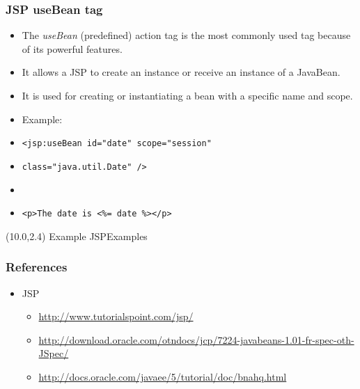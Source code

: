 \documentclass[10pt,xcolor=pdflatex]{beamer}
\begin{document}
\begin{frame}[containsverbatim]\frametitle{JSP useBean tag}
	\begin{itemize}
    	\item The \emph{useBean} (predefined) action tag is the most commonly used tag because of its powerful features.
		\item It allows a JSP to create an instance or receive an instance of a JavaBean.
		\item It is used for creating or instantiating a bean with a specific name and scope.
		\item Example:
		\item[] \verb;<jsp:useBean id="date" scope="session";
        \item[] \verb;class="java.util.Date" />;
        \item[] 
        \item[] \verb;<p>The date is <%= date %></p>;
    \end{itemize}
  \begin{textblock}{5}(10.0,2.4)
    {\footnotesize Example JSPExamples}
  \end{textblock}
\end{frame}


\begin{frame}\frametitle{References}
	\begin{itemize}
    	\item JSP
        \begin{itemize}
        	\item \url{http://www.tutorialspoint.com/jsp/}
            \item \url{http://download.oracle.com/otndocs/jcp/7224-javabeans-1.01-fr-spec-oth-JSpec/}
            \item \url{http://docs.oracle.com/javaee/5/tutorial/doc/bnahq.html}
        \end{itemize}
    \end{itemize}
\end{frame}

\end{document}
